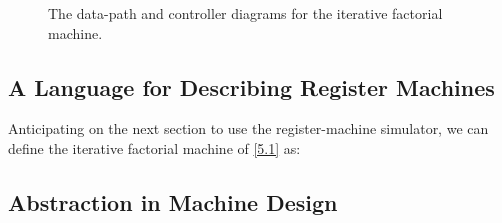 \begin{exe}[5.1]
\begin{figure}
        \caption{The data-path and controller diagrams for the iterative 
        factorial machine.}
        \label{5.1fig}
    \end{figure}
\end{exe}

\subsection{A Language for Describing Register Machines}

\begin{exe}[5.2]
    Anticipating on the next section to use the register-machine simulator, we 
    can define the iterative factorial machine of \autoref{5.1} as:
\end{exe}

\subsection{Abstraction in Machine Design}

